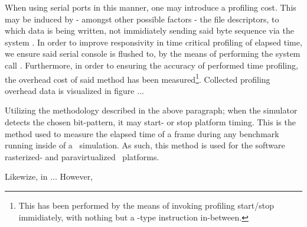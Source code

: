 
When using serial ports in this manner, one may introduce a profiling cost.
This may be induced by - amongst other possible factors - the file descriptors, to which data is being written, not immidiately sending said byte sequence via the system \dvttermuart .
In order to improve responsivity in time critical profiling of elapsed time, we ensure said serial console is flushed to, by the means of performing the system call .
Furthermore, in order to ensuring the accuracy of performed time profiling, the overhead cost of said method has been measured\footnote{This has been performed by the means of invoking profiling start/stop immidiately, with nothing but a -type instruction in-between.}.
Collected profiling overhead data is visualized in figure  ...


Utilizing the methodology described in the above paragraph; when the simulator detects the chosen bit-pattern, it may start- or stop platform timing.
This is the method used to measure the elapsed time of a frame during any benchmark running inside of a \dvttermsimics\ simulation.
As such, this method is used for the software rasterized- and paravirtualized \dvttermsimics\ platforms. 

Likewize, in \dvttermqemu ...
However,


